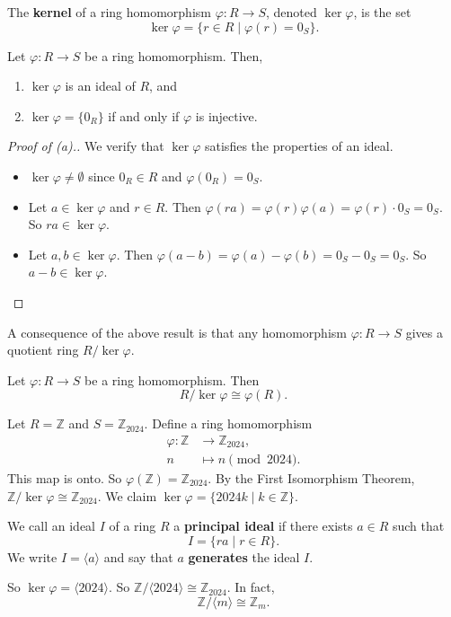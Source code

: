 \begin{definition}[kernel]
	The \textbf{kernel} of a ring homomorphism $\varphi\colon R\to S$, denoted $\ker\varphi$, is the set
	$$\ker\varphi=\{r\in R\mid\varphi(r)=0_S\}.$$
\end{definition}

\begin{theorem}
	Let $\varphi\colon R\to S$ be a ring homomorphism. Then,
	\begin{enumerate}
		\item $\ker\varphi$ is an ideal of $R$, and
		\item $\ker\varphi=\{0_R\}$ if and only if $\varphi$ is injective.
	\end{enumerate}
\end{theorem}

\begin{proof}[{\color{main}\sffamily\itshape Proof of (a).}]
	We verify that $\ker\varphi$ satisfies the properties of an ideal.
	\begin{itemize}
		\item $\ker\varphi\neq\emptyset$ since $0_R\in R$ and $\varphi(0_R)=0_S$.
		\item Let $a\in\ker\varphi$ and $r\in R$. Then $\varphi(ra)=\varphi(r)\varphi(a)=\varphi(r)\cdot 0_S=0_S$. So $ra\in\ker\varphi$.
		\item Let $a,b\in\ker\varphi$. Then $\varphi(a-b)=\varphi(a)-\varphi(b)=0_S-0_S=0_S$. So $a-b\in\ker\varphi$.
	\end{itemize}
\end{proof}

A consequence of the above result is that any homomorphism $\varphi\colon R\to S$ gives a quotient ring $R/\ker\varphi$.

\begin{theorem}
	Let $\varphi\colon R\to S$ be a ring homomorphism. Then
	$$R/\ker\varphi\cong\varphi(R).$$
\end{theorem}

\begin{example}
	Let $R=\mathbb Z$ and $S=\mathbb Z_{2024}$. Define a ring homomorphism
	\begin{align*}
		\varphi\colon\mathbb Z&\to\mathbb Z_{2024},\\
		n&\mapsto n\pmod{2024}.
	\end{align*}
	This map is onto. So $\varphi(\mathbb Z)=\mathbb Z_{2024}$. By the First Isomorphism Theorem, $\mathbb Z/\ker\varphi\cong\mathbb Z_{2024}$. We claim $\ker\varphi=\{2024k\mid k\in\mathbb Z\}$.

	\begin{definition}
		We call an ideal $I$ of a ring $R$ a \textbf{principal ideal} if there exists $a\in R$ such that
		$$I=\{ra\mid r\in R\}.$$
		We write $I=\langle a\rangle$ and say that $a$ \textbf{generates} the ideal $I$.
	\end{definition}
	So $\ker\varphi=\langle 2024\rangle$. So $\mathbb Z/\langle 2024\rangle\cong\mathbb Z_{2024}$. In fact,
	$$\mathbb Z/\langle m\rangle\cong\mathbb Z_{m}.$$
\end{example}

